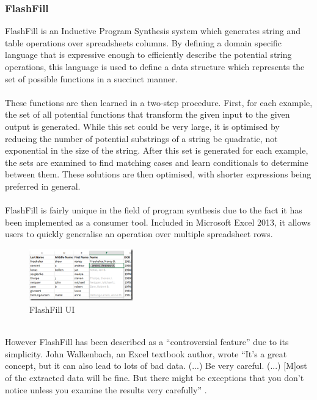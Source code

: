 \subsubsection{FlashFill}
FlashFill \cite{Gulwani2012} is an Inductive Program Synthesis system which generates string and table operations over spreadsheets columns. By defining a domain specific language that is expressive enough to efficiently describe the potential string operations, this language is used to define a data structure which represents the set of possible functions in a succinct manner. \\ \\
These functions are then learned in a two-step procedure. First, for each example, the set of all potential functions that transform the given input to the given output is generated. While this set could be very large, it is optimised by reducing the number of potential substrings of a string be quadratic, not exponential in the size of the string. After this set is generated for each example, the sets are examined to find matching cases and learn conditionals to determine between them. These solutions are then optimised, with shorter expressions being preferred in general.\\ \\
FlashFill is fairly unique in the field of program synthesis due to the fact it has been implemented as a consumer tool. Included in Microsoft Excel 2013, it allows users to quickly generalise an operation over multiple spreadsheet rows.

\begin{figure}[h!]
\centering
\includegraphics[width=0.4\textwidth]{C2/flash_fill.png}
\caption{FlashFill UI}
\label{fig:flashfill}
\end{figure}
\mbox{}\\
However FlashFill has been described as a ``controversial feature'' due to its simplicity. John Walkenbach, an Excel textbook author, wrote ``It's a great concept, but it can also lead to lots of bad data. (...) Be very careful. (...) [M]ost of the extracted data will be fine. But there might be exceptions that you don't notice unless you examine the results very carefully'' \cite{Bauer2016}.

%
%

\pagebreak